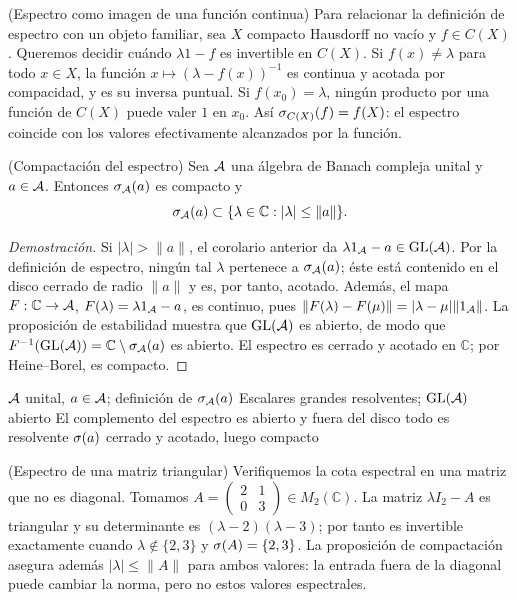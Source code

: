 \begin{cthejemplo}{(Espectro como imagen de una función continua)}
Para relacionar la definición de espectro con un objeto familiar, sea
$X$ compacto Hausdorff no vacío y $f\in C(X)$. Queremos decidir cuándo
$\lambda1-f$ es invertible en $C(X)$. Si
$f(x)\ne\lambda$ para todo $x\in X$, la función
$x\mapsto(\lambda-f(x))^{-1}$ es continua y acotada por compacidad,
y es su inversa puntual. Si $f(x_0)=\lambda$, ningún producto por una
función de $C(X)$ puede valer $1$ en $x_0$. Así
$\sigma_{C(X)}(f)=f(X)$: el espectro coincide con los valores
efectivamente alcanzados por la función.
\end{cthejemplo}

\pagebreak
\begin{cthproposicion}{(Compactación del espectro)}
Sea $\mathcal A$ una álgebra de Banach compleja unital y $a\in\mathcal A$.
Entonces $\sigma_\mathcal A(a)$ es compacto y
\[
 \sigma_\mathcal A(a)\subset\{\lambda\in\mathbb C:|\lambda|\le\|a\|\}.
\]
\end{cthproposicion}

\begin{proof}[Demostración]
Si $|\lambda|>\|a\|$, el corolario anterior da
$\lambda1_\mathcal A-a\in\operatorname{GL}(\mathcal A)$. Por la definición de espectro, ningún
tal $\lambda$ pertenece a $\sigma_\mathcal A(a)$; éste está contenido en el
disco cerrado de radio $\|a\|$ y es, por tanto, acotado.
Además, el mapa $F:\mathbb C\to\mathcal A$, $F(\lambda)=\lambda1_\mathcal A-a$,
es continuo, pues
$\|F(\lambda)-F(\mu)\|=|\lambda-\mu|\|1_\mathcal A\|$.
La proposición de estabilidad muestra que $\operatorname{GL}(\mathcal A)$ es abierto, de modo que
$F^{-1}(\operatorname{GL}(\mathcal A))=\mathbb C\setminus\sigma_\mathcal A(a)$ es abierto.
El espectro es cerrado y acotado en $\mathbb C$; por Heine--Borel, es compacto.
\end{proof}

\proofdiagram
{$\mathcal A$ unital, $a\in\mathcal A$; definición de $\sigma_\mathcal A(a)$}
{Escalares grandes resolventes; $\operatorname{GL}(\mathcal A)$ abierto}
{El complemento del espectro es abierto y fuera del disco todo es resolvente}
{$\sigma(a)$ cerrado y acotado, luego compacto}

\begin{cthejemplo}{(Espectro de una matriz triangular)}
Verifiquemos la cota espectral en una matriz que no es diagonal.
Tomamos $A=\begin{pmatrix}2&1\\0&3\end{pmatrix}\in M_2(\mathbb C)$.
La matriz $\lambda I_2-A$ es triangular y su determinante es
$(\lambda-2)(\lambda-3)$; por tanto es invertible exactamente cuando
$\lambda\notin\{2,3\}$ y $\sigma(A)=\{2,3\}$.
La proposición de compactación asegura además $|\lambda|\le\|A\|$
para ambos valores: la entrada fuera de la diagonal puede cambiar la
norma, pero no estos valores espectrales.
\end{cthejemplo}


